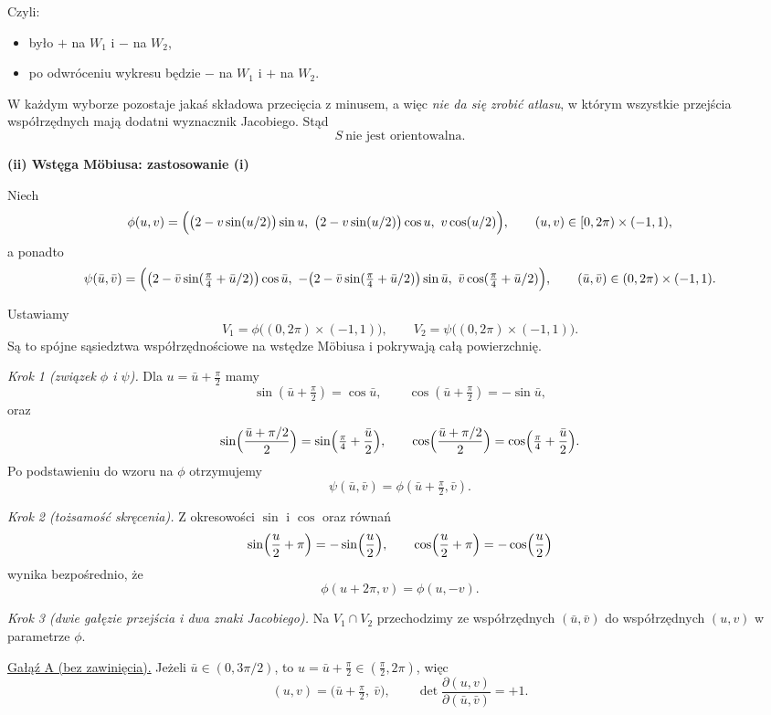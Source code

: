 \documentclass[12pt,a4paper]{article}
\theoremstyle{plain}
\theoremstyle{definition}      %
\begin{document}
Czyli:
\begin{itemize}
	\item było $+$ na $W_1$ i $-$ na $W_2$,
	\item po odwróceniu wykresu będzie $-$ na $W_1$ i $+$ na $W_2$.
\end{itemize}

W każdym wyborze pozostaje jakaś składowa przecięcia z minusem, a więc \emph{nie da się zrobić atlasu},
w którym wszystkie przejścia współrzędnych mają dodatni wyznacznik Jacobiego.
Stąd
\[
\boxed{\ S\ \text{nie jest orientowalna.}\ }
\]

\bigskip

\noindent\textbf{(ii) Wstęga M\"obiusa: zastosowanie (i)}  

Niech
\[
\phi(u,v)=\Bigl(\bigl(2-v\sin(u/2)\bigr)\sin u,\ \bigl(2-v\sin(u/2)\bigr)\cos u,\ v\cos(u/2)\Bigr),
\qquad (u,v)\in[0,2\pi)\times(-1,1),
\]
a ponadto
\[
\psi(\bar u,\bar v)=\Bigl(\bigl(2-\bar v\sin(\tfrac\pi4+\bar u/2)\bigr)\cos\bar u,\ 
-\bigl(2-\bar v\sin(\tfrac\pi4+\bar u/2)\bigr)\sin\bar u,\ 
\bar v\cos(\tfrac\pi4+\bar u/2)\Bigr),
\qquad (\bar u,\bar v)\in(0,2\pi)\times(-1,1).
\]

Ustawiamy
\[
V_1=\phi\bigl((0,2\pi)\times(-1,1)\bigr),
\qquad
V_2=\psi\bigl((0,2\pi)\times(-1,1)\bigr).
\]
Są to spójne sąsiedztwa współrzędnościowe na wstędze M\"obiusa i pokrywają całą powierzchnię.

\medskip
\noindent\emph{Krok 1 (związek $\phi$ i $\psi$).}
Dla $u=\bar u+\frac{\pi}{2}$ mamy
\[
\sin(\bar u+\tfrac{\pi}{2})=\cos\bar u,
\qquad
\cos(\bar u+\tfrac{\pi}{2})=-\sin\bar u,
\]
oraz
\[
\sin\Bigl(\frac{\bar u+\pi/2}{2}\Bigr)=\sin\Bigl(\tfrac{\pi}{4}+\frac{\bar u}{2}\Bigr),
\qquad
\cos\Bigl(\frac{\bar u+\pi/2}{2}\Bigr)=\cos\Bigl(\tfrac{\pi}{4}+\frac{\bar u}{2}\Bigr).
\]
Po podstawieniu do wzoru na $\phi$ otrzymujemy
\[
\boxed{\ \psi(\bar u,\bar v)=\phi(\bar u+\tfrac{\pi}{2},\bar v).\ }
\tag{1}
\]

\medskip
\noindent\emph{Krok 2 (tożsamość skręcenia).}
Z okresowości $\sin$ i $\cos$ oraz równań
\[
\sin\Bigl(\frac{u}{2}+\pi\Bigr)=-\sin\Bigl(\frac{u}{2}\Bigr),
\qquad
\cos\Bigl(\frac{u}{2}+\pi\Bigr)=-\cos\Bigl(\frac{u}{2}\Bigr)
\]
wynika bezpośrednio, że
\[
\boxed{\ \phi(u+2\pi,v)=\phi(u,-v).\ }
\tag{2}
\]

\medskip
\noindent\emph{Krok 3 (dwie gałęzie przejścia i dwa znaki Jacobiego).}
Na $V_1\cap V_2$ przechodzimy ze współrzędnych $(\bar u,\bar v)$ do współrzędnych $(u,v)$ w parametrze $\phi$.

\smallskip
\noindent\underline{Gałąź A (bez zawinięcia).}
Jeżeli $\bar u\in(0,3\pi/2)$, to $u=\bar u+\frac{\pi}{2}\in(\frac{\pi}{2},2\pi)$, więc
\[
(u,v)=\bigl(\bar u+\tfrac{\pi}{2},\ \bar v\bigr),
\qquad
\det\frac{\partial(u,v)}{\partial(\bar u,\bar v)}=+1.
\]
\end{document}
